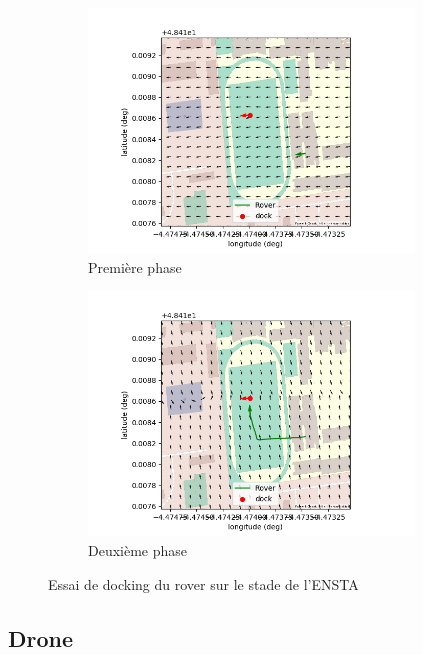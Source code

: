 \documentclass[12pt]{report}
\begin{document}
\begin{figure}[H]
  \centering
  \begin{subfigure}{0.45\textwidth}
    \centering
    \includegraphics[width=0.95\textwidth]{imgs/visu_2.png}
    \caption{Première phase}
  \end{subfigure}
  \begin{subfigure}{0.45\textwidth}
    \centering
    \includegraphics[width=0.95\textwidth]{imgs/visu_1.png}
    \caption{Deuxième phase}

  \end{subfigure}
  \caption{Essai de docking du rover sur le stade de l'ENSTA}
  \label{fig:rover_exp1}

\end{figure}

\subsection{Drone}
\end{document}
